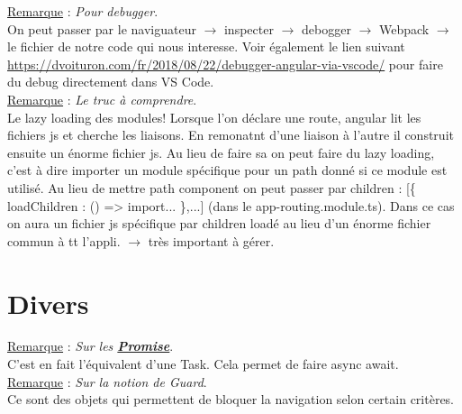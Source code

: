 \documentclass[a4paper,12pt,twoside]{article}
\newcommand{\urlcolor}{magenta}  %
\newcommand{\keycolor}{purple} %
\newcommand{\rem}[2]{\noindent\underline{Remarque} : \textit{#1}.\\ \indent #2}
\newcommand{\keyref}[2]{\hypersetup{urlcolor=\keycolor} \href{#1}{\textbf{#2}}\hypersetup{urlcolor=\urlcolor}}
\begin{document}
\rem{Pour debugger}{ On peut passer par le naviguateur $\to$ inspecter $\to$ debogger $\to$ Webpack $\to$ le fichier de notre code qui nous interesse. Voir également le lien suivant \url{https://dvoituron.com/fr/2018/08/22/debugger-angular-via-vscode/} pour faire du debug directement dans VS Code.}\\

\rem{Le truc à comprendre}{Le lazy loading des modules! Lorsque l'on déclare une route, angular lit les fichiers js et cherche les liaisons. En remonatnt d'une liaison à l'autre il construit ensuite un énorme fichier js. Au lieu de faire sa on peut faire du lazy loading, c'est à dire importer un module spécifique pour un path donné si ce module est utilisé. Au lieu de mettre path component on peut passer par children : [\{ loadChildren : () => import... \},...] (dans le app-routing.module.ts). Dans ce cas on aura un fichier js spécifique par children loadé au lieu d'un énorme fichier commun à tt l'appli. $\to$ très important à gérer.}\\

\section{Divers}

\rem{Sur les \keyref{https://guide-angular.wishtack.io/angular/callback-hell-vs.-promise-vs.-async-await/promise}{Promise}}{C'est en fait l'équivalent d'une Task. Cela permet de faire async await.}\\

\rem{Sur la notion de Guard}{Ce sont des objets qui permettent de bloquer la navigation selon certain critères.}\\

\end{document}

